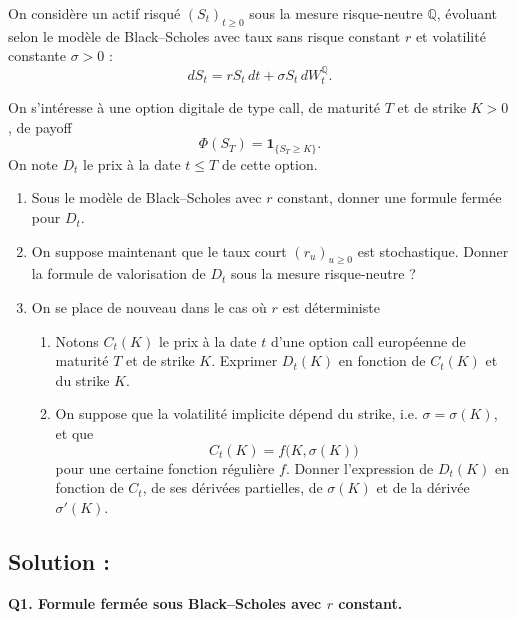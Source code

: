 \begin{exerciseBox}
  On considère un actif risqué $(S_t)_{t \ge 0}$ sous la mesure risque-neutre $\mathbb{Q}$,
  évoluant selon le modèle de Black--Scholes avec taux sans risque constant $r$ et
  volatilité constante $\sigma > 0$ :
  \[
  dS_t = r S_t \, dt + \sigma S_t \, dW_t^{\mathbb{Q}}.
  \]
  
  On s'intéresse à une option digitale de type call, de maturité $T$ et de strike $K > 0$,
  de payoff
  \[
  \Phi(S_T) = \mathbf{1}_{\{S_T \ge K\}}.
  \]
  On note $D_t$ le prix à la date $t \le T$ de cette option.
  
  \begin{enumerate}
    \item[\textbf{Q1.}] Sous le modèle de Black--Scholes avec $r$ constant, donner une formule
    fermée pour $D_t$.
  
    \item[\textbf{Q2.}] On suppose maintenant que le taux court $(r_u)_{u\ge 0}$ est stochastique.
    Donner la formule de valorisation de $D_t$ sous la mesure risque-neutre ?
  
    \item[\textbf{Q3.}] On se place de nouveau dans le cas où $r$ est déterministe 
    \begin{enumerate}
      \item[(a)] Notons $C_t(K)$ le prix à la date $t$ d'une option call européenne de maturité $T$
      et de strike $K$. Exprimer $D_t(K)$ en fonction de $C_t(K)$ et du strike $K$.
  
      \item[(b)] On suppose que la volatilité implicite dépend du strike, i.e. $\sigma = \sigma(K)$,
      et que
      \[
        C_t(K) = f\big(K, \sigma(K)\big)
      \]
      pour une certaine fonction régulière $f$. Donner l'expression de $D_t(K)$ en fonction
      de $C_t$, de ses dérivées partielles, de $\sigma(K)$ et de la dérivée $\sigma'(K)$.
    \end{enumerate}
  \end{enumerate}
\end{exerciseBox}


\subsection*{Solution :}

\textbf{Q1. Formule fermée sous Black--Scholes avec $r$ constant.}

